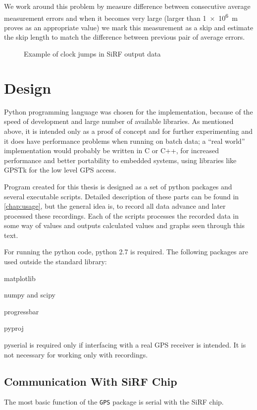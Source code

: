 We work around this problem by measure difference between consecutive average
measurement errors and when it becomes very large (larger than \SI{1e6}{\meter} proves as an
appropriate value) we mark this measurement as a skip and estimate the skip
length to match the difference between previous pair of average errors.

\begin{figure}[tp]
	\centering
	\caption{Example of clock jumps in SiRF output data}
	\label{fig:impl-clock-jumps}
\end{figure}

\section{Design}
Python programming language was chosen for the implementation,
because of the speed of development and large number of available libraries.
As mentioned above, it is intended only as a proof of
concept and for further experimenting and it does have performance problems
when running on batch data; a \enquote{real world} implementation
would probably be written in C or C++, for increased performance and better portability
to embedded systems, using libraries like GPSTk \cite{tolman04} for the low level GPS access.

Program created for this thesis is designed as a set of python packages and
several executable scripts.
Detailed description of these parts can be found in \cref{chap:usage},
but the general idea is, to record all data advance and later processed these
recordings.
Each of the scripts processes the recorded data in some way of values and
outputs calculated values and graphs seen through this text.

For running the python code, python 2.7 is required.
The following packages are used outside the standard library:
\begin{compactitem}
\item matplotlib
\item numpy and scipy
\item progressbar
\item pyproj
\item pyserial is required only if interfacing with a real
    GPS receiver is intended. It is not necessary for working only with recordings.
\end{compactitem}

\subsection{Communication With SiRF Chip}
The most basic function of the \verb=GPS= package is serial with the
SiRF chip.

